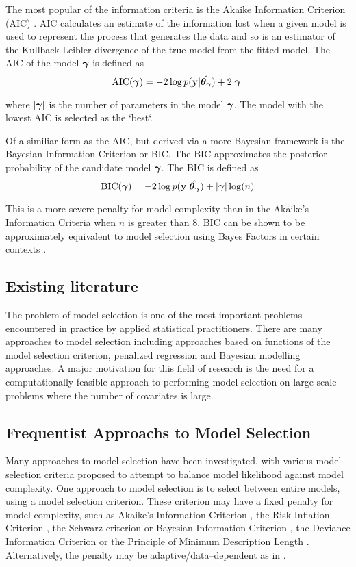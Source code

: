 \documentclass{amsart}[12pt]
\begin{document}
The most popular of the information criteria is the Akaike Information Criterion (AIC) \cite{Akaike1974}. AIC
calculates an estimate of the information lost when a given model is used to represent the process that
generates the data and so is an estimator of the Kullback-Leibler divergence of the true model from the fitted
model. The AIC of the model ${\boldsymbol \gamma}$ is defined as
\[
	\text{AIC}({\boldsymbol \gamma}) = -2 \log p({\bf y} | \hat{{\boldsymbol \theta}_{\boldsymbol \gamma}}) + 2 |{\boldsymbol \gamma}|
\]

where $|{\boldsymbol \gamma}|$ is the number of parameters in the model ${\boldsymbol \gamma}$. The model with the lowest AIC is selected
as the `best`.

Of a similiar form as the AIC, but derived via a more Bayesian framework is the Bayesian Information Criterion
or BIC. The BIC approximates the posterior probability of the candidate model ${\boldsymbol \gamma}$. The BIC is defined as
\[
	\text{BIC}({\boldsymbol \gamma}) = -2 \log p({\bf y} | \hat{{\boldsymbol \theta}_{\boldsymbol \gamma}}) + |{\boldsymbol \gamma}| \log(n)
\]

This is a more severe penalty for model complexity than in the Akaike's Information Criteria when $n$ is
greater than $8$. BIC can be shown to be approximately equivalent to model selection using Bayes Factors
in certain contexts \cite{Kass1993}.

\subsection{Existing literature}
The problem of model selection is one of the most important problems encountered in practice by applied
statistical practitioners. There are many approaches to model selection including approaches based on
functions of the model selection criterion, penalized regression and Bayesian modelling approaches. A major
motivation for this field of research is the need for a computationally feasible approach to performing model
selection on large scale problems where the number of covariates is large.

\subsection{Frequentist Approachs to Model Selection}
Many approaches to model selection have been investigated, with various model selection criteria proposed to
attempt to balance model likelihood against model complexity. One approach to model selection is to select
between entire models, using a model selection criterion. These criterion may have a fixed penalty for model
complexity, such as Akaike's Information Criterion \citep{Akaike1974}, the Risk Inflation Criterion
\citep{Foster1994}, the Schwarz criterion or Bayesian Information Criterion \citep{Schwarz1978}, the Deviance
Information Criterion \citep{Spiegelhalter2016} or the Principle of Minimum Description Length
\citep{Hansen2001}. Alternatively, the penalty may be adaptive/data--dependent as in \citep{George2000}.
\end{document}
